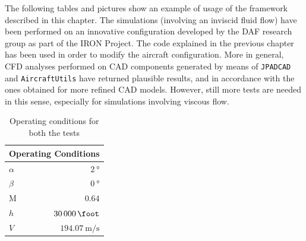 The following tables and pictures show an example of usage of the framework described in this chapter. The simulations (involving an inviscid fluid flow) have been performed on an innovative configuration developed by the DAF research group as part of the IRON Project. The code explained in the previous chapter has been used in order to modify the aircraft configuration. More in general, \gls{CFD} analyses performed on \gls{CAD} components generated by means of \lstinline[language=Java]!JPADCAD! and \lstinline[language=Java]!AircraftUtils! have returned plausible results, and in accordance with the ones obtained for more refined \gls{CAD} models. However, still more tests are needed in this sense, especially for simulations involving viscous flow.
%
\bigskip
\begin{table}[H]
\centering
\begin{tabular}{lr}
\toprule
\multicolumn{2}{c}{\textbf{Operating Conditions}} \\
\midrule
$\alpha$ & $\SI{2}{\degree}$ \\
$\beta$ & $\SI{0}{\degree}$ \\
$\text{M}$ & $0.64$\\
$h$ & $\SI{30000}{\foot}$ \\
$V$ & $\SI{194.07}{\meter\per\second}$ \\
\bottomrule
\end{tabular}
\caption{Operating conditions for both the tests}
\label{tab:Operating_Conditions}
\end{table}
%
\begingroup
